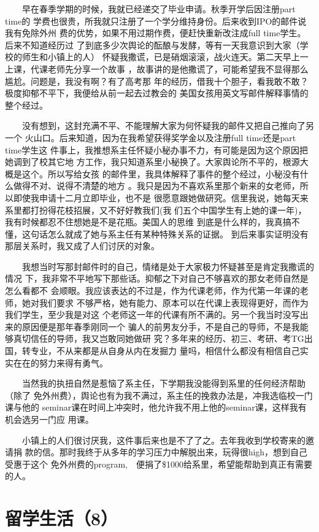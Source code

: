 \documentclass[12pt]{book}
\begin{document}
　　早在春季学期的时候，我就已经递交了毕业申请。秋季开学后因注册part time的
学费也很贵，所我就只注册了一个学分维持身份。后来收到IPO的邮件说我有免除外州
费的优势，如果不用过期作费，便赶快重新改注成full time学生。后来不知道经历过
了到底多少次舆论的酝酿与发酵，等有一天我意识到大家（学校的师生和小镇上的人）
怀疑我撒谎，已是硝烟滚滚，战火连天。第二天早上一上课，代课老师先分享一个故事
，故事讲的是他撒谎了，可能希望我不显得那么尴尬。问题是，我没有啊？有了高考那
年的经历，借我十个胆子，看我敢不敢？极度抑郁不平下，我便给从前一起去过教会的
美国女孩用英文写邮件解释事情的整个经过。

　　没有想到，这封充满不平、不能理解大家为何怀疑我的邮件又把自己推向了另一个
火山口。后来知道，因为在我希望获得奖学金以及注册full time还是part time学生这
件事上，我推想系主任怀疑小秘办事不力，有可能是因为这个原因把她调到了校其它地
方工作，我只知道系里小秘换了。大家舆论所不平的，根源大概是这个。所以写给女孩
的邮件里，我具体解释了事件的整个经过，小秘没有什么做得不对、说得不清楚的地方
。我只是因为不喜欢系里那个新来的女老师，所以即使我申请十二月立即毕业，也不是
很愿意跟她做研究。信里我说，她每天来系里都打扮得花枝招展，又不好好教我们(我
们五个中国学生有上她的课一年)，我有时候都忍不住想她是不是花瓶。美国人的思维
到底是什么样的，我真搞不懂，这句话怎么就成了她与系主任有某种特殊关系的证据。
到后来事实证明没有那层关系时，我又成了人们讨厌的对象。

　　我想当时写那封邮件时的自己，情绪是处于大家极力怀疑甚至是肯定我撒谎的情况
下，我非常不平地写下那些话。抑郁之下对自己不够喜欢的那女老师自然是怎么看都不
会顺眼。我应该表达的不过是，作为代课老师，作为代第一年课的老师，她对我们要求
不够严格，她有能力、原本可以在代课上表现得更好，而作为我们学生，至少我是对这
个老师这一年的代课有所不满的。另一个我当时没写出来的原因便是那年春季刚同一个
骗人的前男友分手，不是自己的导师，不是我能够真切信任的导师，我又岂敢同她做研
究？多年来的经历、初三、考研、考TG出国，转专业，不从来都是从自身从内在发掘力
量吗，相信什么都没有相信自己实实在在的努力来得有勇气。

　　当然我的执扭自然是惹恼了系主任，下学期我没能得到系里的任何经济帮助（除了
免外州费），舆论也有为我不满过，系主任的挽救办法是，冲我选临校一门课与他的
seminar课在时间上冲突时，他允许我不用上他的seminar课，这样我有机会选另一门应
用课。

　　小镇上的人们很讨厌我，这件事后来也是不了了之。去年我收到学校寄来的邀请捐
款的信。那时我终于从多年的学习压力中解脱出来，玩得很high，想到自己受惠于这个
免外州费的program,　便捐了\$1000给系里，希望能帮助到真正有需要的人。
\section{留学生活（8）}
\label{sec-6-8}
\end{document}
